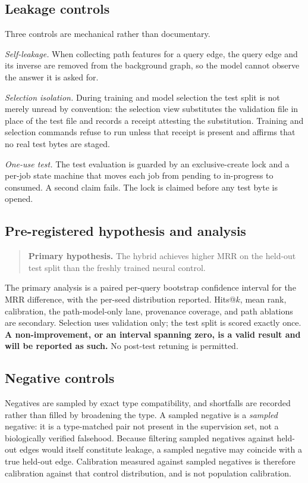 \documentclass[11pt]{article}
\begin{document}
\subsection{Leakage controls}

Three controls are mechanical rather than documentary.

\emph{Self-leakage.} When collecting path features for a query edge, the query
edge and its inverse are removed from the background graph, so the model cannot
observe the answer it is asked for.

\emph{Selection isolation.} During training and model selection the test split
is not merely unread by convention: the selection view substitutes the
validation file in place of the test file and records a receipt attesting the
substitution. Training and selection commands refuse to run unless that receipt
is present and affirms that no real test bytes are staged.

\emph{One-use test.} The test evaluation is guarded by an exclusive-create lock
and a per-job state machine that moves each job from pending to in-progress to
consumed. A second claim fails. The lock is claimed before any test byte is
opened.

\subsection{Pre-registered hypothesis and analysis}

\begin{quote}
\textbf{Primary hypothesis.} The hybrid achieves higher MRR on the held-out test
split than the freshly trained neural control.
\end{quote}

The primary analysis is a paired per-query bootstrap confidence interval for the
MRR difference, with the per-seed distribution reported. Hits@$k$, mean rank,
calibration, the path-model-only lane, provenance coverage, and path ablations
are secondary. Selection uses validation only; the test split is scored exactly
once. \textbf{A non-improvement, or an interval spanning zero, is a valid result
and will be reported as such.} No post-test retuning is permitted.

\subsection{Negative controls}

Negatives are sampled by exact type compatibility, and shortfalls are recorded
rather than filled by broadening the type. A sampled negative is a
\emph{sampled} negative: it is a type-matched pair not present in the
supervision set, not a biologically verified falsehood. Because filtering
sampled negatives against held-out edges would itself constitute leakage, a
sampled negative may coincide with a true held-out edge. Calibration measured
against sampled negatives is therefore calibration against that control
distribution, and is not population calibration.
\end{document}
